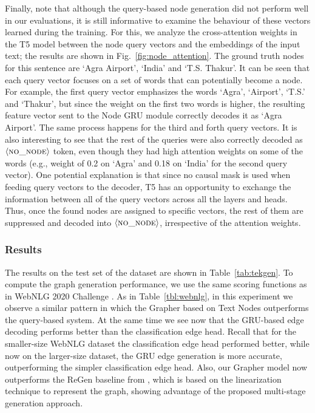 Finally, note that although the query-based node generation did not perform well in our evaluations, it is still informative to examine the behaviour of these vectors learned during the training. For this, we analyze the cross-attention weights in the T5 model between the node query vectors and the embeddings of the input text; the results are shown in Fig.~\ref{fig:node_attention}. The ground truth nodes for this sentence are `Agra Airport', `India' and `T.S. Thakur'. It can be seen that each query vector focuses on a set of words that can potentially become a node. For example, the first query vector emphasizes the words `Agra', `Airport', `T.S.' and `Thakur', but since the weight on the first two words is higher, the resulting feature vector sent to the Node GRU module correctly decodes it as `Agra Airport'. The same process happens for the third and forth query vectors. It is also interesting to see that the rest of the queries were also correctly decoded as $\langle \textsc{no\_node}\rangle$ token, even though they had high attention weights on some of the words (e.g., weight of 0.2 on `Agra' and 0.18 on `India' for the second query vector). One potential explanation is that since no causal mask is used when feeding query vectors to the decoder, T5 has an opportunity to exchange the information between all of the query vectors across all the layers and heads. Thus, once the found nodes are assigned to specific vectors, the rest of them are suppressed and decoded into $\langle \textsc{no\_node}\rangle$, irrespective of the attention weights.




\subsubsection{\tekgen Results}


The results on the test set of the \tekgen dataset \cite{agarwal2021knowledge} are shown in Table~\ref{tab:tekgen}. To compute the graph generation performance, we use the same scoring functions as in WebNLG 2020 Challenge \cite{Ferreira2020The2B}. As in Table~\ref{tbl:webnlg}, in this experiment we observe a similar pattern in which the Grapher based on Text Nodes outperforms the query-based system. At the same time we see now that the GRU-based edge decoding performs better than the classification edge head. Recall that for the smaller-size WebNLG dataset the classification edge head performed better, while now on the larger-size \tekgen dataset, the GRU edge generation is more accurate, outperforming the simpler classification edge head. Also, our Grapher model now outperforms the ReGen baseline from \cite{dognin2021regen}, which is based on the linearization technique to represent the graph, showing advantage of the proposed multi-stage generation approach.



